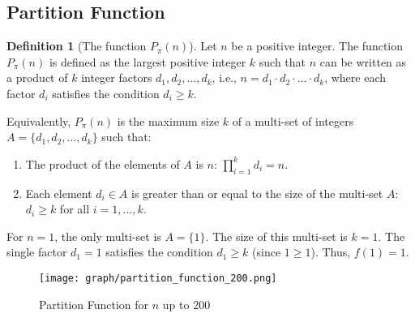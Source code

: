 \documentclass[]{article}
\theoremstyle{plain}%
\theoremstyle{definition}
\newtheorem{defn}{Definition}[section]
\theoremstyle{remark}
\begin{document}
\subsection{Partition Function}
\begin{defn}[The function $P_{\pi}(n)$]
	\label{defn:part_func}
	Let $n$ be a positive integer. The function $P_{\pi}(n)$ is defined as the largest positive integer $k$ such that $n$ can be written as a product of $k$ integer factors $d_1, d_2, \ldots, d_k$, i.e., $n = d_1 \cdot d_2 \cdot \ldots \cdot d_k$, where each factor $d_i$ satisfies the condition $d_i \ge k$.
	
	Equivalently, $P_{\pi}(n)$ is the maximum size $k$ of a multi-set of integers $A = \{d_1, d_2, \ldots, d_k\}$ such that:
	\begin{enumerate}
		\item The product of the elements of $A$ is $n$: $\prod_{i=1}^k d_i = n$.
		\item Each element $d_i \in A$ is greater than or equal to the size of the multi-set $A$: $d_i \ge k$ for all $i=1, \ldots, k$.
	\end{enumerate}
	For $n=1$, the only multi-set is $A=\{1\}$. The size of this multi-set is $k=1$. The single factor $d_1=1$ satisfies the condition $d_1 \ge k$ (since $1 \ge 1$). Thus, $f(1)=1$.
\end{defn}
\begin{figure}[h]
	\caption{Partition Function for $n$ up to 200}
	\centering
	\texttt{[image: graph/partition\_function\_200.png]}
\end{figure}
\end{document}

